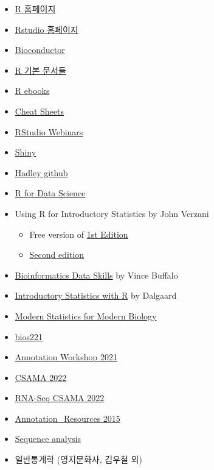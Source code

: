 \documentclass[
]{book}
\providecommand{\tightlist}{%
  \setlength{\itemsep}{0pt}\setlength{\parskip}{0pt}}
\begin{document}
\begin{itemize}
\tightlist
\item
  \href{https://www.r-project.org/}{R 홈페이지}
\item
  \href{https://www.rstudio.com/}{Rstudio 홈페이지}
\item
  \href{https://www.bioconductor.org/}{Bioconductor}
\item
  \href{https://cran.r-project.org/manuals.html}{R 기본 문서들}
\item
  \href{https://bookdown.org/}{R ebooks}
\item
  \href{https://www.rstudio.com/resources/cheatsheets/}{Cheat Sheets}
\item
  \href{https://resources.rstudio.com/}{RStudio Webinars}
\item
  \href{http://shiny.rstudio.com/tutorial/}{Shiny}
\item
  \href{https://github.com/hadley}{Hadley github}
\item
  \href{https://r4ds.had.co.nz}{R for Data Science}
\item
  Using R for Introductory Statistics by John Verzani

  \begin{itemize}
  \tightlist
  \item
    Free version of \href{https://cran.r-project.org/doc/contrib/Verzani-SimpleR.pdf}{1st Edition}
  \item
    \href{https://www.crcpress.com/Using-R-for-Introductory-Statistics-Second-Edition/Verzani/p/book/9781466590731}{Second edition}
  \end{itemize}
\item
  \href{http://2.droppdf.com/files/5aTvl/bioinformatics-data-skills.pdf}{Bioinformatics Data Skills} by Vince Buffalo
\item
  \href{http://www.academia.dk/BiologiskAntropologi/Epidemiologi/PDF/Introductory_Statistics_with_R__2nd_ed.pdf}{Introductory Statistics with R} by Dalgaard
\item
  \href{http://web.stanford.edu/class/bios221/book/index.html}{Modern Statistics for Modern Biology}
\item
  \href{https://web.stanford.edu/class/bios221/labs/}{bios221}
\item
  \href{https://jmacdon.github.io/Bioc2021Anno/articles/AnnotationWorkshop.html\#summarizedexperiment-objects-1}{Annotation Workshop 2021}
\item
  \href{https://www.bioconductor.org/help/course-materials/2022/CSAMA/}{CSAMA 2022}
\item
  \href{https://www.bioconductor.org/help/course-materials/2022/CSAMA/lab/2-tuesday/lab-03-rnaseq/rnaseqGene_CSAMA2022.html}{RNA-Seq CSAMA 2022}
\item
  \href{https://bioconductor.org/help/course-materials/2015/BioC2015/Annotation_Resources.html}{Annotation\_Resources 2015}
\item
  \href{http://bioconductor.org/help/course-materials/2015/LearnBioconductorFeb2015/A01.3_BioconductorForSequenceAnalysis.html}{Sequence analysis}
\item
  일반통계학 (영지문화사, 김우철 외)
\end{itemize}
\end{document}
